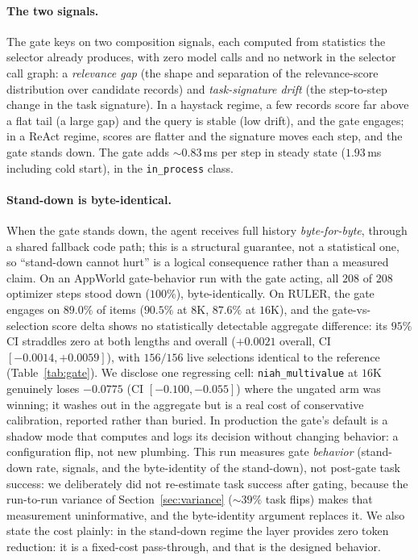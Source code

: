 \documentclass[11pt]{article}
\begin{document}
\paragraph{The two signals.} The gate keys on two composition signals, each computed from
statistics the selector already produces, with zero model calls and no network in the selector
call graph: a \emph{relevance gap} (the shape and separation of the relevance-score
distribution over candidate records) and \emph{task-signature drift} (the step-to-step
change in the task signature). In a haystack regime, a few records score far above a flat tail (a
large gap) and the query is stable (low drift), and the gate engages; in a ReAct regime, scores
are flatter and the signature moves each step, and the gate stands down. The gate adds
${\sim}0.83$\,ms per step in steady state ($1.93$\,ms including cold start), in the
\texttt{in\_process} class.

\paragraph{Stand-down is byte-identical.} When the gate stands down, the agent receives full
history \emph{byte-for-byte}, through a shared fallback code path; this is a structural guarantee,
not a statistical one, so ``stand-down cannot hurt'' is a logical consequence rather than a
measured claim. On an AppWorld gate-behavior run with the gate acting, all $208$ of $208$ optimizer
steps stood down ($100\%$), byte-identically. On RULER, the gate engages on $89.0\%$ of items
($90.5\%$ at $8$K, $87.6\%$ at $16$K), and the gate-vs-selection score delta shows no statistically
detectable aggregate difference: its $95\%$ CI straddles zero at both lengths and overall
($+0.0021$ overall, CI $[-0.0014,+0.0059]$), with $156/156$ live selections identical to the
reference (Table~\ref{tab:gate}). We disclose one regressing cell:
\texttt{niah\_multivalue} at $16$K genuinely loses $-0.0775$ (CI $[-0.100,-0.055]$) where the
ungated arm was winning; it washes out in the aggregate but is a real cost of conservative
calibration, reported rather than buried. In production the gate's default is a shadow mode that
computes and logs its decision without changing behavior: a configuration flip, not new
plumbing. This run measures gate \emph{behavior} (stand-down rate, signals, and the
byte-identity of the stand-down), not post-gate task success: we deliberately did not re-estimate
task success after gating, because the run-to-run variance of Section~\ref{sec:variance}
(${\sim}39\%$ task flips) makes that measurement uninformative, and the byte-identity argument
replaces it. We also state the cost plainly: in the stand-down regime the layer provides zero token
reduction: it is a fixed-cost pass-through, and that is the designed behavior.
\end{document}
